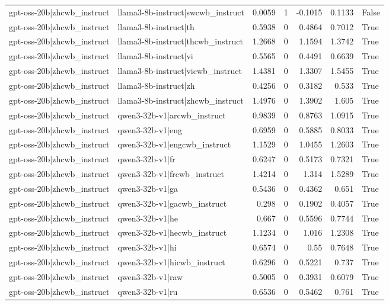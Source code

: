 \begin{table}
\begin{tabular}{l l r r r r l}
gpt-oss-20b|zhcwb_instruct & llama3-8b-instruct|swcwb_instruct & 0.0059 & 1 & -0.1015 & 0.1133 & False \\
gpt-oss-20b|zhcwb_instruct & llama3-8b-instruct|th & 0.5938 & 0 & 0.4864 & 0.7012 & True \\
gpt-oss-20b|zhcwb_instruct & llama3-8b-instruct|thcwb_instruct & 1.2668 & 0 & 1.1594 & 1.3742 & True \\
gpt-oss-20b|zhcwb_instruct & llama3-8b-instruct|vi & 0.5565 & 0 & 0.4491 & 0.6639 & True \\
gpt-oss-20b|zhcwb_instruct & llama3-8b-instruct|vicwb_instruct & 1.4381 & 0 & 1.3307 & 1.5455 & True \\
gpt-oss-20b|zhcwb_instruct & llama3-8b-instruct|zh & 0.4256 & 0 & 0.3182 & 0.533 & True \\
gpt-oss-20b|zhcwb_instruct & llama3-8b-instruct|zhcwb_instruct & 1.4976 & 0 & 1.3902 & 1.605 & True \\
gpt-oss-20b|zhcwb_instruct & qwen3-32b-v1|arcwb_instruct & 0.9839 & 0 & 0.8763 & 1.0915 & True \\
gpt-oss-20b|zhcwb_instruct & qwen3-32b-v1|eng & 0.6959 & 0 & 0.5885 & 0.8033 & True \\
gpt-oss-20b|zhcwb_instruct & qwen3-32b-v1|engcwb_instruct & 1.1529 & 0 & 1.0455 & 1.2603 & True \\
gpt-oss-20b|zhcwb_instruct & qwen3-32b-v1|fr & 0.6247 & 0 & 0.5173 & 0.7321 & True \\
gpt-oss-20b|zhcwb_instruct & qwen3-32b-v1|frcwb_instruct & 1.4214 & 0 & 1.314 & 1.5289 & True \\
gpt-oss-20b|zhcwb_instruct & qwen3-32b-v1|ga & 0.5436 & 0 & 0.4362 & 0.651 & True \\
gpt-oss-20b|zhcwb_instruct & qwen3-32b-v1|gacwb_instruct & 0.298 & 0 & 0.1902 & 0.4057 & True \\
gpt-oss-20b|zhcwb_instruct & qwen3-32b-v1|he & 0.667 & 0 & 0.5596 & 0.7744 & True \\
gpt-oss-20b|zhcwb_instruct & qwen3-32b-v1|hecwb_instruct & 1.1234 & 0 & 1.016 & 1.2308 & True \\
gpt-oss-20b|zhcwb_instruct & qwen3-32b-v1|hi & 0.6574 & 0 & 0.55 & 0.7648 & True \\
gpt-oss-20b|zhcwb_instruct & qwen3-32b-v1|hicwb_instruct & 0.6296 & 0 & 0.5221 & 0.737 & True \\
gpt-oss-20b|zhcwb_instruct & qwen3-32b-v1|raw & 0.5005 & 0 & 0.3931 & 0.6079 & True \\
gpt-oss-20b|zhcwb_instruct & qwen3-32b-v1|ru & 0.6536 & 0 & 0.5462 & 0.761 & True \\

\end{tabular}
\end{table}
